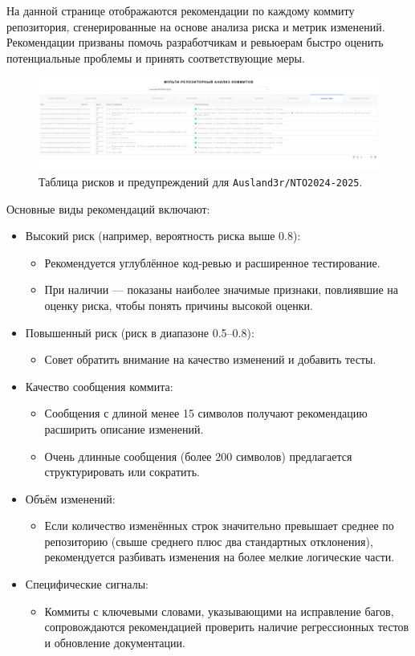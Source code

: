На данной странице отображаются рекомендации по каждому коммиту репозитория, сгенерированные на основе анализа риска и метрик изменений. Рекомендации призваны помочь разработчикам и ревьюерам быстро оценить потенциальные проблемы и принять соответствующие меры.

\begin{figure}[ht]
	\centering
	\includegraphics[width=\textwidth]{my_folder/images/capa_page.png}
	\caption{Таблица рисков и предупреждений для \texttt{Ausland3r/NTO2024-2025}.}
	\label{fig:timeline123}
\end{figure}

Основные виды рекомендаций включают:

\begin{itemize}
	\item Высокий риск (например, вероятность риска выше 0.8): 
	\begin{itemize}
		\item Рекомендуется углублённое код-ревью и расширенное тестирование.
		\item При наличии — показаны наиболее значимые признаки, повлиявшие на оценку риска, чтобы понять причины высокой оценки.
	\end{itemize}
	\item Повышенный риск (риск в диапазоне 0.5–0.8): 
	\begin{itemize}
		\item Совет обратить внимание на качество изменений и добавить тесты.
	\end{itemize}
	\item Качество сообщения коммита:
	\begin{itemize}
		\item Сообщения с длиной менее 15 символов получают рекомендацию расширить описание изменений.
		\item Очень длинные сообщения (более 200 символов) предлагается структурировать или сократить.
	\end{itemize}
	\item Объём изменений:
	\begin{itemize}
		\item Если количество изменённых строк значительно превышает среднее по репозиторию (свыше среднего плюс два стандартных отклонения), рекомендуется разбивать изменения на более мелкие логические части.
	\end{itemize}
	\item Специфические сигналы:
	\begin{itemize}
		\item Коммиты с ключевыми словами, указывающими на исправление багов, сопровождаются рекомендацией проверить наличие регрессионных тестов и обновление документации.
	\end{itemize}
\end{itemize}

